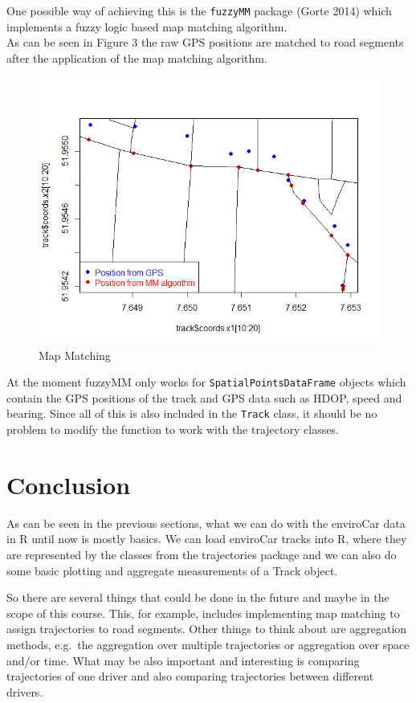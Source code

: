 \documentclass[]{article}
\begin{document}
One possible way of achieving this is the \texttt{fuzzyMM} package
(Gorte 2014) which implements a fuzzy logic based map matching
algorithm.\\As can be seen in Figure 3 the raw GPS positions are matched
to road segments after the application of the map matching algorithm.

\begin{figure}[h!]
  \centering
    \includegraphics[width=1\textwidth]{figures/urban.png}
    \caption{Map Matching}
    \label{fig:mm}
\end{figure}

At the moment fuzzyMM only works for \texttt{SpatialPointsDataFrame}
objects which contain the GPS positions of the track and GPS data such
as HDOP, speed and bearing. Since all of this is also included in the
\texttt{Track} class, it should be no problem to modify the function to
work with the trajectory classes.

\section{Conclusion}\label{conclusion}

As can be seen in the previous sections, what we can do with the
enviroCar data in R until now is mostly basics. We can load enviroCar
tracks into R, where they are represented by the classes from the
trajectories package and we can also do some basic plotting and
aggregate measurements of a Track object.

So there are several things that could be done in the future and maybe
in the scope of this course. This, for example, includes implementing
map matching to assign trajectories to road segments. Other things to
think about are aggregation methods, e.g.~the aggregation over multiple
trajectories or aggregation over space and/or time. What may be also
important and interesting is comparing trajectories of one driver and
also comparing trajectories between different drivers.
\end{document}
